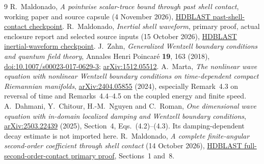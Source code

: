 \documentclass[10pt]{article}
\begin{document}
\begin{thebibliography}{9}\small
{} R.~Maldonado, \emph{A pointwise scalar-trace bound through
past shell contact}, working paper and source capsule (4 November 2026),
\href{https://github.com/maldonado-research/HDblast/tree/b2a2fce15ca1870fff3e4bc312a65480c9e839cf/research/HDBLAST_PAST_SHELL_CONTACT_20261104}{HDBLAST past-shell-contact checkpoint}.
 R.~Maldonado, \emph{Inertial shell waveform}, primary proof,
actual enclosure report and selected source inputs (15 October 2026),
\href{https://github.com/maldonado-research/HDblast/tree/415ab642d0a13720c03594c6968f9aede67d4c34/research/HDBLAST_INERTIAL_SHELL_WAVEFORM_20261015}{HDBLAST inertial-waveform checkpoint}.
 J.~Zahn, \emph{Generalized Wentzell boundary conditions and
quantum field theory}, Annales Henri Poincar\'e \textbf{19}, 163 (2018),
\href{https://doi.org/10.1007/s00023-017-0629-3}{doi:10.1007/s00023-017-0629-3};
\href{https://arxiv.org/abs/1512.05512}{arXiv:1512.05512}.
 A.~Marta, \emph{The nonlinear wave equation with nonlinear
Wentzell boundary conditions on time-dependent compact Riemannian manifolds},
\href{https://arxiv.org/abs/2404.05855}{arXiv:2404.05855} (2024),
especially Remark~4.3 on reversal of time and Remarks~4.4--4.5 on the
coupled energy and finite speed.
 A.~Dahmani, Y.~Chitour, H.-M.~Nguyen and C.~Roman,
\emph{One dimensional wave equation with in-domain localized damping and
Wentzell boundary conditions},
\href{https://arxiv.org/abs/2503.22439}{arXiv:2503.22439} (2025),
Section~4, Eqs.~(4.2)--(4.3). Its damping-dependent decay estimate is not
imported here.
 R.~Maldonado, \emph{A complete finite-angular second-order
coefficient through shell contact} (14 October 2026),
\href{https://github.com/maldonado-research/HDblast/blob/f4001e5d94e6388bfff4f82dee63c174f2dfd5eb/research/HDBLAST_FULL_SECOND_ORDER_CONTACT_20261014/FULL_FINITE_ANGULAR_SECOND_ORDER_CONTACT.md}{HDBLAST full-second-order-contact primary proof}, Sections~1 and~8.
\end{thebibliography}
\end{document}
